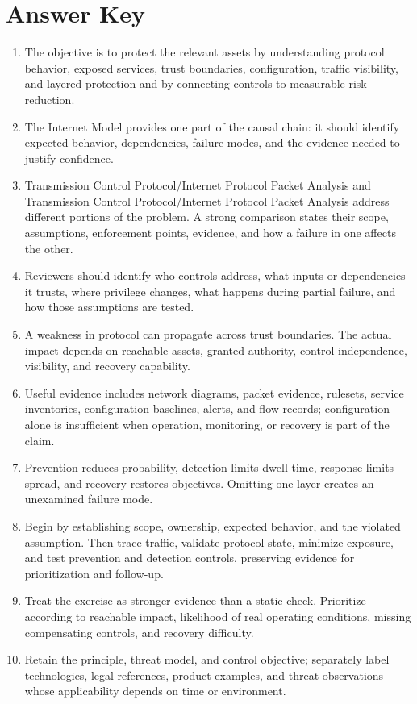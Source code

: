 \documentclass[11pt,letterpaper]{article}
\begin{document}
\section*{Answer Key}
\begin{enumerate}
\item The objective is to protect the relevant assets by understanding protocol behavior, exposed services, trust boundaries, configuration, traffic visibility, and layered protection and by connecting controls to measurable risk reduction.
\item The Internet Model provides one part of the causal chain: it should identify expected behavior, dependencies, failure modes, and the evidence needed to justify confidence.
\item Transmission Control Protocol/Internet Protocol Packet Analysis and Transmission Control Protocol/Internet Protocol Packet Analysis address different portions of the problem. A strong comparison states their scope, assumptions, enforcement points, evidence, and how a failure in one affects the other.
\item Reviewers should identify who controls address, what inputs or dependencies it trusts, where privilege changes, what happens during partial failure, and how those assumptions are tested.
\item A weakness in protocol can propagate across trust boundaries. The actual impact depends on reachable assets, granted authority, control independence, visibility, and recovery capability.
\item Useful evidence includes network diagrams, packet evidence, rulesets, service inventories, configuration baselines, alerts, and flow records; configuration alone is insufficient when operation, monitoring, or recovery is part of the claim.
\item Prevention reduces probability, detection limits dwell time, response limits spread, and recovery restores objectives. Omitting one layer creates an unexamined failure mode.
\item Begin by establishing scope, ownership, expected behavior, and the violated assumption. Then trace traffic, validate protocol state, minimize exposure, and test prevention and detection controls, preserving evidence for prioritization and follow-up.
\item Treat the exercise as stronger evidence than a static check. Prioritize according to reachable impact, likelihood of real operating conditions, missing compensating controls, and recovery difficulty.
\item Retain the principle, threat model, and control objective; separately label technologies, legal references, product examples, and threat observations whose applicability depends on time or environment.
\end{enumerate}
\end{document}
